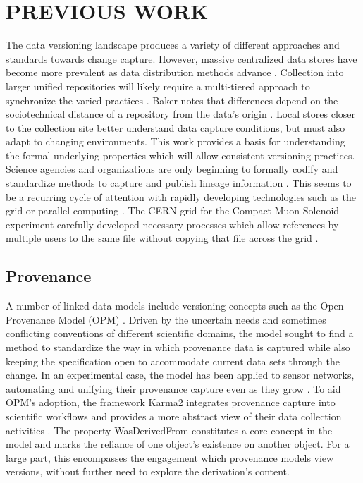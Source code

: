 
\chapter{PREVIOUS WORK}

The data versioning landscape produces a variety of different approaches and standards towards change capture.
However, massive centralized data stores have become more prevalent as data distribution methods advance  \cite{Vassiliadis1999}.
Collection into larger unified repositories will likely require a multi-tiered approach to synchronize the varied practices  \cite{Baker2009}.
Baker notes that differences depend on the sociotechnical distance of a repository from the data's origin \cite{Baker2009}.
Local stores closer to the collection site better understand data capture conditions, but must also adapt to changing environments.
This work provides a basis for understanding the formal underlying properties which will allow consistent versioning practices.
Science agencies and organizations are only beginning to formally codify and standardize methods to capture and publish lineage information \cite{MatthewS.Mayernik201312-039}.
This seems to be a recurring cycle of attention with rapidly developing technologies such as the grid or parallel computing \cite{Kovse2003VGridAVS}.
The CERN grid for the Compact Muon Solenoid experiment carefully developed necessary processes which allow references by multiple users to the same file without copying that file across the grid \cite{Holtman:687353}.

\section{Provenance}

A number of linked data models include versioning concepts such as the Open Provenance Model (OPM) \cite{moreau2008open}.
Driven by the uncertain needs and sometimes conflicting conventions of different scientific domains, the model sought to find a method to standardize the way in which provenance data is captured while also keeping the specification open to accommodate current data sets through the change.
In an experimental case, the model has been applied to sensor networks, automating and unifying their provenance capture even as they grow \cite{5478496}.
To aid OPM's adoption, the framework Karma2 integrates provenance capture into scientific workflows and provides a more abstract view of their data collection activities \cite{simmhan2010karma2}.
The property WasDerivedFrom constitutes a core concept in the model and marks the reliance of one object's existence on another object.
For a large part, this encompasses the engagement which provenance models view versions, without further need to explore the derivation's content.

